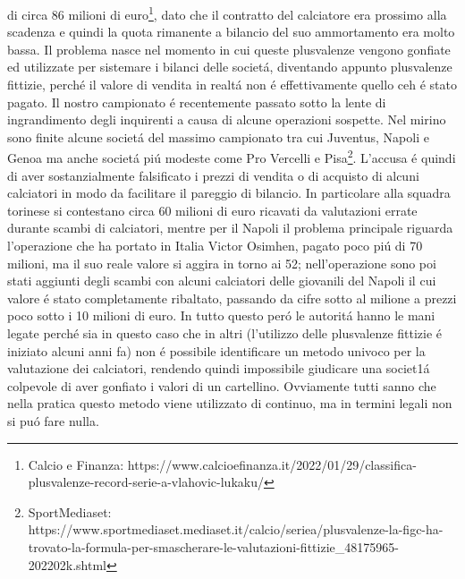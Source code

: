 \documentclass[
    corpo=12pt,
    oneside,
    evenboxes,
    tipotesi=triennale,
    stile=classica,
    oldstyle,
    autoretitolo,
    greek,
]{toptesi}
\begin{document}
\begin{interlinea}{1.5}
di circa 86 milioni di euro\footnote{Calcio e Finanza: https://www.calcioefinanza.it/2022/01/29/classifica-plusvalenze-record-serie-a-vlahovic-lukaku/}, 
dato che il contratto del calciatore era prossimo alla scadenza e quindi la quota rimanente a bilancio del suo ammortamento era molto bassa. 
Il problema nasce nel momento in cui queste plusvalenze vengono gonfiate ed utilizzate per sistemare i bilanci delle societ\'a, diventando 
appunto plusvalenze fittizie, perch\'e il valore di vendita in realt\'a non \'e effettivamente quello ceh \'e stato pagato. Il nostro campionato
\'e recentemente passato sotto la lente di ingrandimento degli inquirenti a causa di alcune operazioni sospette. Nel mirino sono finite alcune societ\'a
del massimo campionato tra cui Juventus, Napoli e Genoa ma anche societ\'a pi\'u modeste come Pro Vercelli e Pisa\footnote{SportMediaset: https://www.sportmediaset.mediaset.it/calcio/seriea/plusvalenze-la-figc-ha-trovato-la-formula-per-smascherare-le-valutazioni-fittizie\_48175965-202202k.shtml}. L'accusa \'e quindi di 
aver sostanzialmente falsificato i prezzi di vendita o di acquisto di alcuni calciatori in modo da facilitare il pareggio di bilancio.
In particolare alla squadra torinese si contestano circa 60 milioni di euro ricavati da valutazioni errate durante scambi di calciatori, mentre per 
il Napoli il problema principale riguarda l'operazione che ha portato in Italia Victor Osimhen, pagato poco pi\'u di 70 milioni, ma il suo reale 
valore si aggira in torno ai 52; nell'operazione sono poi stati aggiunti degli scambi con alcuni calciatori delle giovanili del Napoli il cui
valore \'e stato completamente ribaltato, passando da cifre sotto al milione a prezzi poco sotto i 10 milioni di euro. In tutto questo per\'o
le autorit\'a hanno le mani legate perch\'e sia in questo caso che in altri (l'utilizzo delle plusvalenze fittizie \'e iniziato alcuni anni fa)
non \'e possibile identificare un metodo univoco per la valutazione dei calciatori, rendendo quindi impossibile giudicare una societ1\'a
colpevole di aver gonfiato i valori di un cartellino. Ovviamente tutti sanno che nella pratica questo metodo viene utilizzato di continuo,
ma in termini legali non si pu\'o fare nulla.\newline


\end{interlinea}
\end{document}
